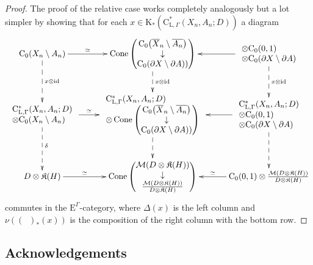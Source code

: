 \documentclass[pdftex]{sigma}
\numberwithin{equation}{section}
\theoremstyle{definition}
\newcommand{\Ct}{\mathrm{C}}
\newcommand{\Cz}{\Ct_0}
\DeclareMathOperator{\id}{id}
\DeclareMathOperator{\Cone}{Cone}
\newcommand{\ev}[1]{\mathop{\textrm{ev}_{#1}}}
\newcommand{\K}{\mathrm{K}}
\newcommand{\EE}{\mathrm{E}}
\newcommand{\Loc}{\mathrm{C}^*_{\mathrm{L},\Gamma}}
\newcommand{\Kom}{{\mathfrak{K}}}
\newcommand{\multiplier}{{\mathcal{M}}}
\begin{document}
\begin{proof}
The proof of the relative case works completely analogously but a lot simpler by showing that for each $x\in \K_*(\Loc(X_n,A_n;D))$ a diagram
\[
\xymatrix{
\Cz(X_n\setminus A_n)
\ar[r]^-{\simeq}\ar@{-->}[d]^-{x\otimes\id}
&\Cone {\begin{pmatrix}
\Cz\big(\overline{X}_n\setminus\overline{A_n}\big)\\\downarrow\\\Cz(\partial X\setminus\partial A))
\end{pmatrix}}
\ar@{-->}[d]^-{x\otimes\id}
&{\begin{array}{l}
\otimes\Cz(0,1)\\\otimes\Cz(\partial X\setminus\partial A)
\end{array}}
\ar[l]\ar@{-->}[d]^-{x\otimes\id}
\\{\begin{array}{l}
\Loc(X_n,A_n;D)\\\otimes\Cz(X_n\setminus A_n)
\end{array}}\ar[r]^-{\simeq}\ar@{-->}[d]^{\delta}
&{\begin{array}{l}
\Loc(X_n,A_n;D)\\\otimes\Cone {\begin{pmatrix}
\Cz\big(\overline{X}_n\setminus\overline{A_n}\big)\\\downarrow\\\Cz(\partial X\setminus\partial A))
\end{pmatrix}}\end{array}}\ar@{-->}[d]
&{\begin{array}{l}
\Loc(X_n,A_n;D)\\\otimes\Cz(0,1)\\\otimes\Cz(\partial X\setminus\partial A)
\end{array}}\ar[l]\ar@{-->}[d]
\\D\otimes\Kom(H)
\ar[r]^-{\simeq}
&\Cone{\begin{pmatrix}\multiplier(D\otimes\Kom(H))\\\downarrow\\\frac{\multiplier(D\otimes\Kom(H))}{D\otimes\Kom(H)}\end{pmatrix}}
&\Cz(0,1)\otimes \frac{\multiplier(D\otimes\Kom(H))}{D\otimes\Kom(H)}
\ar[l]_-{\simeq}
}
\]
commutes in the $\EE^\Gamma$-category, where $\Delta(x)$ is the left column and $\nu((\ev{1})_*(x))$ is the composition of the right column with the bottom row.
\end{proof}

\subsection*{Acknowledgements}
\end{document}
